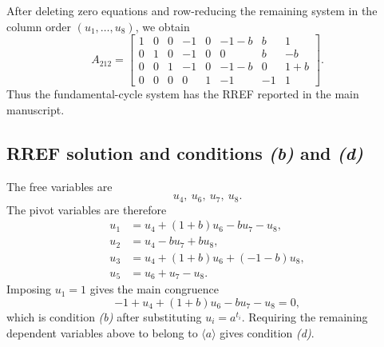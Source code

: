 \documentclass[11pt]{article}
\newcommand{\SpanA}{\langle a\rangle}
\begin{document}
After deleting zero equations and row-reducing the remaining system in the column order $(u_1,\ldots,u_8)$, we obtain
\[
A_{212}=
\begin{bmatrix}
1 & 0 & 0 & -1 & 0 & -1 - b & b & 1 \\
0 & 1 & 0 & -1 & 0 & 0 & b & -b \\
0 & 0 & 1 & -1 & 0 & -1 - b & 0 & 1 + b \\
0 & 0 & 0 & 0 & 1 & -1 & -1 & 1
\end{bmatrix}.
\]
Thus the fundamental-cycle system has the RREF reported in the main manuscript.

\subsection{RREF solution and conditions \emph{(b)} and \emph{(d)}}
The free variables are
\[
u_{4},\ u_{6},\ u_{7},\ u_{8}.
\]
The pivot variables are therefore
\[
\begin{aligned}
u_{1}&=u_{4} + \left(1 + b\right)u_{6} - bu_{7} - u_{8},\\
u_{2}&=u_{4} - bu_{7} + bu_{8},\\
u_{3}&=u_{4} + \left(1 + b\right)u_{6} + \left(-1 - b\right)u_{8},\\
u_{5}&=u_{6} + u_{7} - u_{8}.
\end{aligned}
\]
Imposing $u_1=1$ gives the main congruence
\[
-1 + u_{4} + \left(1 + b\right)u_{6} - bu_{7} - u_{8}=0,
\]
which is condition \emph{(b)} after substituting $u_i=a^{t_i}$.  Requiring the remaining dependent variables above to belong to $\SpanA$ gives condition \emph{(d)}.
\end{document}
